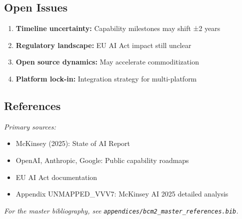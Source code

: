 
\subsection{Open Issues}

\begin{enumerate}
    \item \textbf{Timeline uncertainty:} Capability milestones may shift ±2 years
    \item \textbf{Regulatory landscape:} EU AI Act impact still unclear
    \item \textbf{Open source dynamics:} May accelerate commoditization
    \item \textbf{Platform lock-in:} Integration strategy for multi-platform
\end{enumerate}


\subsection{References}

\noindent\textit{Primary sources:}

\begin{itemize}[nosep]
    \item McKinsey (2025): State of AI Report
    \item OpenAI, Anthropic, Google: Public capability roadmaps
    \item EU AI Act documentation
    \item Appendix UNMAPPED_VVV7: McKinsey AI 2025 detailed analysis
\end{itemize}

\noindent\textit{For the master bibliography, see \texttt{appendices/bcm2\_master\_references.bib}.}



\nocite{bcm_master}



